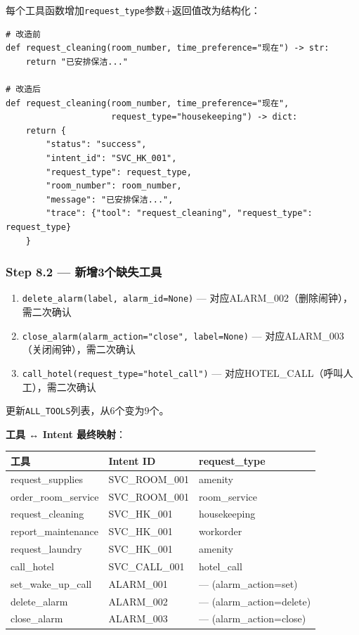 \documentclass[12pt,a4paper]{ctexart}
\begin{document}
每个工具函数增加\texttt{request\_type}参数+返回值改为结构化：

{\small
\begin{verbatim}
# 改造前
def request_cleaning(room_number, time_preference="现在") -> str:
    return "已安排保洁..."

# 改造后
def request_cleaning(room_number, time_preference="现在",
                     request_type="housekeeping") -> dict:
    return {
        "status": "success",
        "intent_id": "SVC_HK_001",
        "request_type": request_type,
        "room_number": room_number,
        "message": "已安排保洁...",
        "trace": {"tool": "request_cleaning", "request_type": request_type}
    }
\end{verbatim}
}

\subsubsection*{Step 8.2 — 新增3个缺失工具}

\begin{enumerate}
    \item \texttt{delete\_alarm(label, alarm\_id=None)} — 对应ALARM\_002（删除闹钟），需二次确认
    \item \texttt{close\_alarm(alarm\_action="close", label=None)} — 对应ALARM\_003（关闭闹钟），需二次确认
    \item \texttt{call\_hotel(request\_type="hotel\_call")} — 对应HOTEL\_CALL（呼叫人工），需二次确认
\end{enumerate}

更新\texttt{ALL\_TOOLS}列表，从6个变为9个。

\textbf{工具 ↔ Intent 最终映射}：

\begin{table}[h]
\centering
\begin{tabular}{@{}lll@{}}
\toprule
\textbf{工具} & \textbf{Intent ID} & \textbf{request\_type} \\
\midrule
request\_supplies & SVC\_ROOM\_001 & amenity \\
order\_room\_service & SVC\_ROOM\_001 & room\_service \\
request\_cleaning & SVC\_HK\_001 & housekeeping \\
report\_maintenance & SVC\_HK\_001 & workorder \\
request\_laundry & SVC\_HK\_001 & amenity \\
call\_hotel & SVC\_CALL\_001 & hotel\_call \\
set\_wake\_up\_call & ALARM\_001 & — (alarm\_action=set) \\
delete\_alarm & ALARM\_002 & — (alarm\_action=delete) \\
close\_alarm & ALARM\_003 & — (alarm\_action=close) \\
\bottomrule
\end{tabular}
\end{table}
\end{document}

